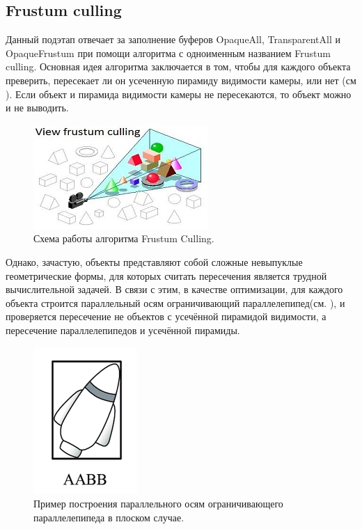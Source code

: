 	\subsection{Frustum culling} \label{ch3:pre_pass:frustum}
		Данный подэтап отвечает за заполнение буферов OpaqueAll, TransparentAll и OpaqueFrustum при помощи алгоритма с одноименным названием Frustum culling. Основная идея алгоритма заключается в том, чтобы для каждого объекта преверить, пересекает ли он усеченную пирамиду видимости камеры, или нет (см ). Если объект и пирамида видимости камеры не пересекаются, то объект можно и не выводить.
		\begin{figure}[ht!] 
			\center
			\includegraphics [scale=1] {my_folder/images//frustum_culling}	
			\caption{Схема работы алгоритма Frustum Culling.} 
			\label{fig:frustum_culling}
		\end{figure}
		
		Однако, зачастую, объекты представляют собой сложные невыпуклые геометрические формы, для которых считать пересечения является трудной вычислительной задачей. В связи с этим, в качестве оптимизации, для каждого объекта строится параллельный осям ограничивающий параллелепипед(см. ), и проверяется пересечение не объектов с усечённой пирамидой видимости, а пересечение параллелепипедов и усечённой пирамиды. 
		
		\begin{figure}[ht!] 
			\center
			\includegraphics [scale=0.8] {my_folder/images//aabb}	
			\caption{Пример построения параллельного осям ограничивающего параллелепипеда в плоском случае.} 
			\label{fig:aabb}
		\end{figure}
		

